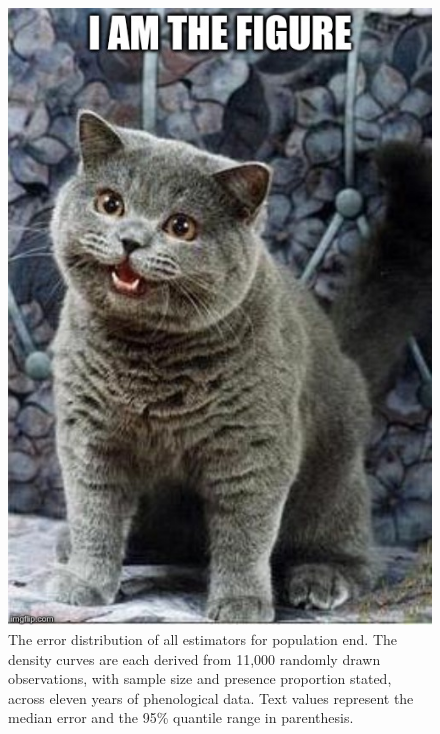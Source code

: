 \begin{figure}
	\centering
		\includegraphics[scale=0.3]{images/figure_filler.jpg}
	\caption[The error distribution of all estimators for population end]{The error distribution of all estimators for population end. The density curves are each derived from 11,000 randomly drawn observations, with sample size and presence proportion stated, across eleven years of phenological data. Text values represent the median error and the 95\% quantile range in parenthesis.} \label{fig-3-2}
\end{figure}

